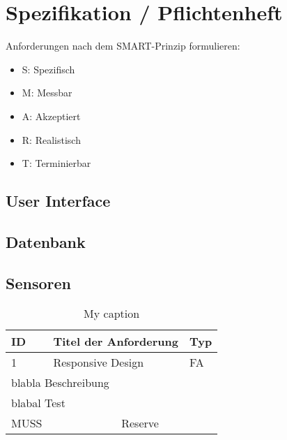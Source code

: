 \chapter{Spezifikation / Pflichtenheft}

Anforderungen nach dem SMART-Prinzip formulieren:

\begin{itemize}  
\item S: Spezifisch 
\item M: Messbar
\item A: Akzeptiert
\item R: Realistisch
\item T: Terminierbar
\end{itemize}


\section{User Interface}

\section{Datenbank}

\section{Sensoren}


\begin{table}[]
\caption{My caption}
\label{my-label}
\begin{tabular}{|l|l|l|l|l|}
\hline
ID      & \multicolumn{3}{l|}{Titel der Anforderung}            &   Typ\\ \hline
1        & \multicolumn{3}{l|}{Responsive Design}            &  FA \\ \hline
\multicolumn{5}{|l|}{blabla Beschreibung}                         \\ \hline
\multicolumn{5}{|l|}{blabal Test}                         \\ \hline
\multicolumn{2}{|l|}{MUSS} & \multicolumn{3}{l|}{Reserve} \\ \hline
\end{tabular}
\end{table}



